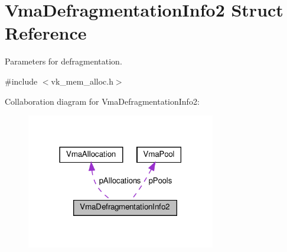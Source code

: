 \hypertarget{structVmaDefragmentationInfo2}{}\section{Vma\+Defragmentation\+Info2 Struct Reference}
\label{structVmaDefragmentationInfo2}


Parameters for defragmentation.  




{\ttfamily \#include $<$vk\+\_\+mem\+\_\+alloc.\+h$>$}



Collaboration diagram for Vma\+Defragmentation\+Info2\+:\nopagebreak
\begin{figure}[H]
\begin{center}
\leavevmode
\includegraphics[width=234pt]{structVmaDefragmentationInfo2__coll__graph}
\end{center}
\end{figure}
